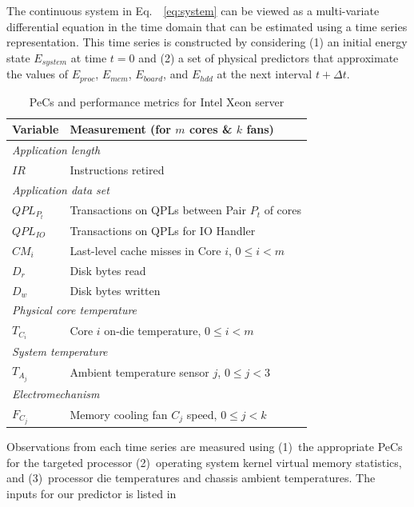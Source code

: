 \documentclass[times, 10pt,twocolumn]{IEEEtran}
\newcommand{\equationnames}{Eq.\ }
\begin{document}
The continuous system in \equationnames~\eqref{eq:system} can be viewed
as a multi-variate differential equation in the time domain that can be
estimated using a time series representation. This time series is
constructed by considering (1) an initial energy state $E_{system}$ at
time $t=0$ and (2) a set of physical predictors that approximate the
values of $E_{proc}$, $E_{mem}$, $E_{board}$, and $E_{hdd}$ at the next
interval $t+\Delta t$.

\newline
\begin{small}
\begin{table}[tbhp]
  \centering
  \caption{PeCs and performance metrics for Intel Xeon server}
  \label{tab:intelmodel}
  \begin{tabular}{l l}
\hline
\hline
\textbf{Variable}&\textbf{Measurement} (for $m$ cores \& $k$ fans)\\
\hline
\hline
\multicolumn{2}{l}{\textit{Application length}}\\
$IR$&Instructions retired \\
\hline
\multicolumn{2}{l}{\textit{Application data set}}\\
$QPL_{P_t}$&Transactions on QPLs between Pair $P_t$ of cores\\
$QPL_{IO}$&Transactions on QPLs for IO Handler\\
$CM_{i}$&Last-level cache misses in  Core $i$, $0\leq i < m$\\
$D_{r}$&Disk bytes read\\
$D_{w}$&Disk bytes written\\
\hline
\multicolumn{2}{l}{\textit{Physical core temperature}}\\
$T_{C_{i}}$&Core $i$ on-die temperature, $0\leq i < m$\\
\hline
\multicolumn{2}{l}{\textit{System temperature}}\\
$T_{A_{j}}$&Ambient temperature sensor $j$, $0\leq j < 3$\\
\hline
\multicolumn{2}{l}{\textit{Electromechanism}}\\
$F_{C_{j}}$&Memory cooling fan $C_j$ speed, $0\leq j < k$\\
\hline
  \end{tabular}
\end{table}
\end{small}
Observations from each time series are measured using (1)~the
appropriate PeCs for the targeted processor (2)~operating system kernel
virtual memory statistics, and (3)~processor die temperatures and
chassis ambient temperatures.  The inputs for our predictor is listed in
\end{document}
